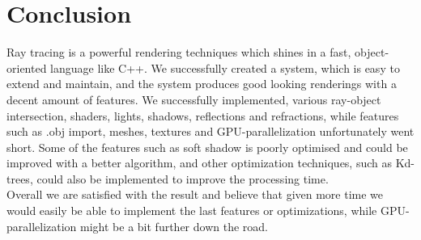 \section{Conclusion}
Ray tracing is a powerful rendering techniques which shines in a fast, object-oriented language like C++. We successfully created a system, which is easy to extend and maintain, and the system produces good looking renderings with a decent amount of features. We successfully implemented, various ray-object intersection, shaders, lights, shadows, reflections and refractions, while features such as .obj import, meshes, textures and GPU-parallelization unfortunately went short. Some of the features such as soft shadow is poorly optimised and could be improved with a better algorithm, and other optimization techniques, such as Kd-trees, could also be implemented to improve the processing time.\\

Overall we are satisfied with the result and believe that given more time we would easily be able to implement the last features or optimizations, while GPU-parallelization might be a bit further down the road.